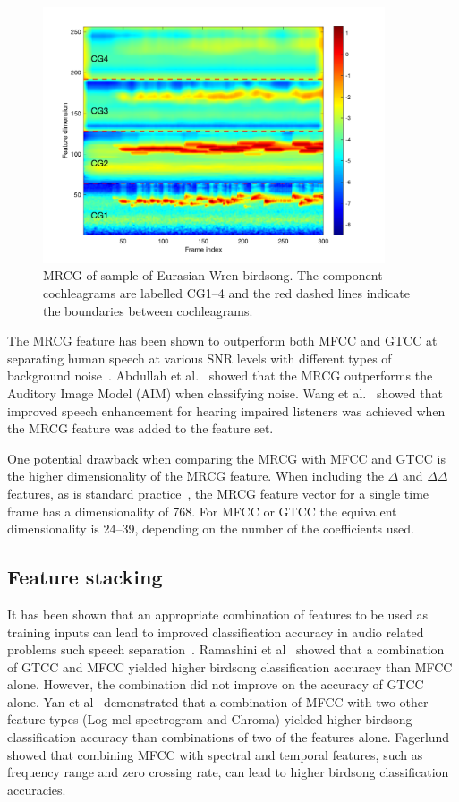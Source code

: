 \begin{figure}[ht]
  \centering
  \includegraphics[width=0.9\textwidth]{figures/mrcg_example.png}
  \caption{MRCG of sample of Eurasian Wren birdsong. The component cochleagrams
  are labelled CG1--4 and the red dashed lines indicate the boundaries
between cochleagrams.}\label{fig:mrcg_example}
\end{figure}

The MRCG feature has been shown to outperform both MFCC and GTCC at
separating human speech at various SNR levels with different types of
background noise~\cite{chen2014feature}. Abdullah et
al.~\cite{binti2020comparison} showed that the MRCG outperforms the Auditory
Image Model (AIM) when classifying noise. Wang et al.~\cite{wang2016joint} showed
that improved speech enhancement for hearing impaired listeners was achieved
when the MRCG feature was added to the feature set.

One potential drawback when comparing the MRCG with MFCC and GTCC is the higher
dimensionality of the MRCG feature. When including the $\Delta$ and
$\Delta\Delta$ features, as is standard
practice~\cite{binti2020comparison,wang2016joint}, the MRCG feature vector for a
single time frame has a dimensionality of 768. For MFCC or GTCC the equivalent
dimensionality is 24--39, depending on the number of the coefficients used.

\subsection{Feature stacking}

It has been shown that an appropriate combination of features to be used as
training inputs can lead to improved classification accuracy in audio related
problems such speech separation~\cite{wang2012exploring}. Ramashini et
al~\cite{ramashini2022robust} showed that a combination of GTCC and MFCC yielded
higher birdsong classification accuracy than MFCC alone. However, the
combination did not improve on the accuracy of GTCC alone. Yan et
al~\cite{yan2021birdsong} demonstrated that a combination of MFCC with two other
feature types (Log-mel spectrogram and Chroma) yielded higher birdsong
classification accuracy than combinations of two of the features alone.
Fagerlund~\cite{fagerlund2007bird} showed that combining MFCC with spectral and
temporal features, such as frequency range and zero crossing rate, can lead to
higher birdsong classification accuracies.

